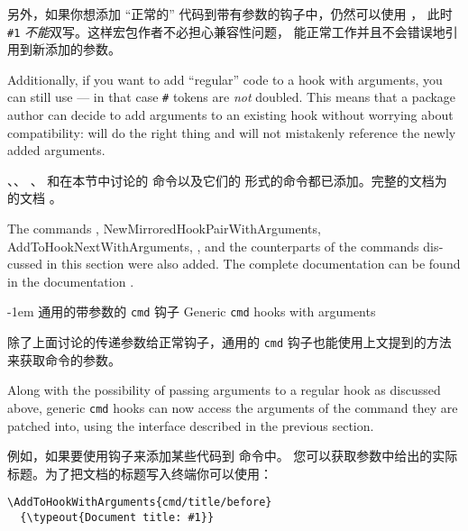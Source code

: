 \documentclass{ltnews}
\makeatletter
\providecommand\hook[1]{\texttt{#1}}
\renewcommand{\subsubsection}{%
   \@startsection      {subsubsection}{2}{0pt}{1.5ex \@plus 1ex \@minus .2ex}%
      {-1em}{\@subheadingfont\colonize}%
}
\providecommand\colonize[1]{#1:}
\newcommand{\zhquote}[1]{“#1”}
\makeatother
\begin{document}
另外，如果你想添加 \zhquote{正常的} 代码到带有参数的钩子中，仍然可以使用 ，
此时 \verb|#1| \emph{不能}双写。这样宏包作者不必担心兼容性问题， 
能正常工作并且不会错误地引用到新添加的参数。

\begin{english}
Additionally, if you want to add \enquote{regular} code to a hook with
arguments, you can still use  --- in that case \verb|#|
tokens are \emph{not} doubled.  This means that a package author can
decide to add arguments to an existing hook without worrying about
compatibility:  will do the right thing and will not
mistakenly reference the newly added arguments.
\end{english}

、、
、 和在本节中讨论的
命令以及它们的  形式的命令都已添加。完整的文档为  的文档 \cite{37:lthooks-doc}。

\begin{english}
The commands , \cs
{NewMirroredHookPairWithArguments}, \cs
{AddToHookNextWithArguments}, , and
the  counterparts of the commands discussed in this section
were also added.  The complete documentation can be found in the
 documentation \cite{37:lthooks-doc}.
\end{english}

\subsubsection{通用的带参数的 \texttt{cmd} 钩子 Generic \texttt{cmd} hooks with arguments}

除了上面讨论的传递参数给正常钩子，通用的 \texttt{cmd} 钩子也能使用上文提到的方法来获取命令的参数。

\begin{english}
Along with the possibility of passing arguments to a regular hook as
discussed above, generic \hook{cmd} hooks can now access the arguments
of the command they are patched into, using the interface described in
the previous section.
\end{english}

例如，如果要使用钩子来添加某些代码到  命令中。
您可以获取参数中给出的实际标题。为了把文档的标题写入终端你可以使用：
\begin{verbatim}
\AddToHookWithArguments{cmd/title/before}
  {\typeout{Document title: #1}}
\end{verbatim}
\end{document}
